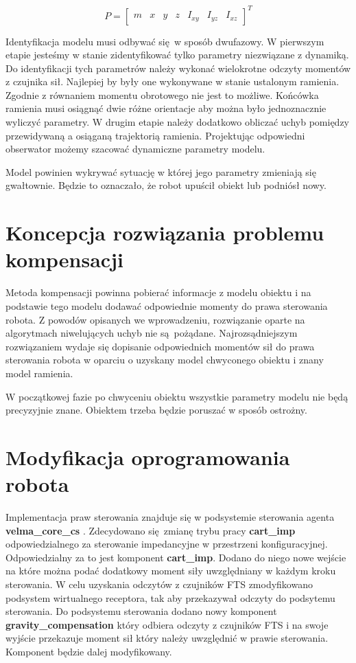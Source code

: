 \documentclass[12pt,a4paper]{article}
\begin{document}
	\begin{equation}
		\label{eq:model}
		P = \begin{bmatrix}
    		m & x &	y &	z & I_{xy} & I_{yz} & I_{xz}
    	\end{bmatrix}^T
	\end{equation}


	Identyfikacja modelu musi odbywać się w sposób dwufazowy. W pierwszym etapie jesteśmy w stanie zidentyfikować tylko parametry niezwiązane z dynamiką. Do identyfikacji tych parametrów należy wykonać wielokrotne odczyty momentów z czujnika sił. Najlepiej by były one wykonywane w stanie ustalonym ramienia. Zgodnie z równaniem momentu obrotowego nie jest to możliwe. Końcówka ramienia musi osiągnąć dwie różne orientacje aby można było jednoznacznie wyliczyć parametry. W drugim etapie należy dodatkowo obliczać uchyb pomiędzy przewidywaną a osiąganą trajektorią ramienia. Projektując odpowiedni obserwator możemy szacować dynamiczne parametry modelu.

	Model powinien wykrywać sytuację w której jego parametry zmieniają się gwałtownie. Będzie to oznaczało, że robot upuścił obiekt lub podniósł nowy.


	\section{Koncepcja rozwiązania problemu kompensacji}
	Metoda kompensacji powinna pobierać informacje z modelu obiektu i na podstawie tego modelu dodawać odpowiednie momenty do prawa sterowania robota. Z powodów opisanych we wprowadzeniu, rozwiązanie oparte na algorytmach niwelujących uchyb nie są pożądane. Najrozsądniejszym rozwiązaniem wydaje się dopisanie odpowiednich momentów sił do prawa sterowania robota w oparciu o uzyskany model chwyconego obiektu i znany model ramienia.

	W początkowej fazie po chwyceniu obiektu wszystkie parametry modelu nie będą precyzyjnie znane. Obiektem trzeba będzie poruszać w sposób ostrożny.


	\section{Modyfikacja oprogramowania robota}
	Implementacja praw sterowania znajduje się w podsystemie sterowania agenta \textbf{velma\_core\_cs} \cite{velma}. Zdecydowano się zmianę trybu pracy \textbf{cart\_imp} odpowiedzialnego za sterowanie impedancyjne w przestrzeni konfiguracyjnej. Odpowiedzialny za to jest komponent \textbf{cart\_imp}. Dodano do niego nowe wejście na które można podać dodatkowy moment siły uwzględniany w każdym kroku sterowania. W celu uzyskania odczytów z czujników FTS zmodyfikowano podsystem wirtualnego receptora, tak aby przekazywał odczyty do podsytemu sterowania. Do podsystemu sterowania dodano nowy komponent \textbf{gravity\_compensation} który odbiera odczyty z czujników FTS i na swoje wyjście przekazuje moment sił który należy uwzględnić w prawie sterowania. Komponent będzie dalej modyfikowany.
\end{document}
